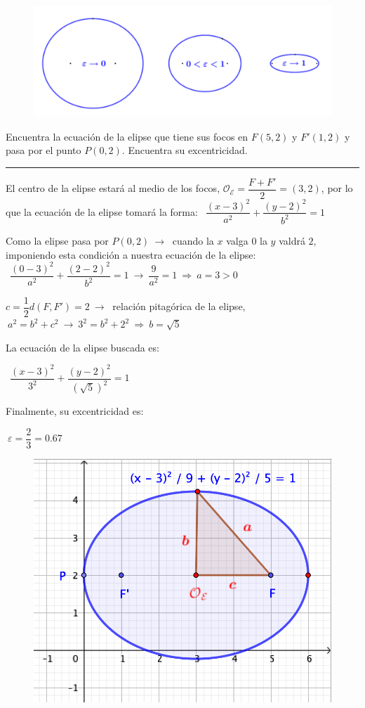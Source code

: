 \begin{figure}[H]
	\centering
	\includegraphics[width=.75\textwidth]{img-conicas/conicas25.png}
	\end{figure}

\begin{miejercicio}

Encuentra la ecuación de la elipse que tiene sus focos en $F(5,2)$ y $F'(1,2)$ y pasa por el punto $P(0,2)$. Encuentra su excentricidad.

\rule{250pt}{0.1pt}

\vspace{2mm} El centro de la elipse estará al medio de los focos, $\mathcal O_{
\mathcal E}=\dfrac{F+F'}{2}=(3,2)$, por lo que la ecuación de la elipse tomará la forma: $\ \ \dfrac{(x-3)^2}{a^2}+\dfrac{(y-2)^2}{b^2}=1$

\vspace{2mm} Como la elipse pasa por $P(0,2) \ \to \ $ cuando la $x$ valga $0$ la $y$ valdrá $2$, imponiendo esta condición a nuestra ecuación de la elipse:
$\ \ \dfrac{(0-3)^2}{a^2}+\dfrac{(2-2)^2}{b^2}=1 \ \to \ \dfrac 9{a^2}=1 \ \Rightarrow \ a=3>0$

\vspace{2mm} $c=\dfrac 12 d(F,F')=2 \ \to \ $ relación pitagórica de la elipse, $\ a^2=b^2+c^2 \ \to \ 3^2=b^2+2^2 \ \Rightarrow \ b=\sqrt{5}$

\begin{multicols}{2}
\vspace{2mm} La ecuación de la elipse buscada es: 

\vspace{4mm}$\ \ \dfrac{(x-3)^2}{3^2}+\dfrac{(y-2)^2}{(\sqrt{5})^2}=1$

\vspace{4mm} Finalmente, su excentricidad es: 

\vspace{4mm}$\ \varepsilon=\dfrac{2}{3}=0.67$

\begin{figure}[H]
	\centering
	\includegraphics[width=.4\textwidth]{img-conicas/conicas26.png}
	\end{figure}
\end{multicols}
\end{miejercicio}

